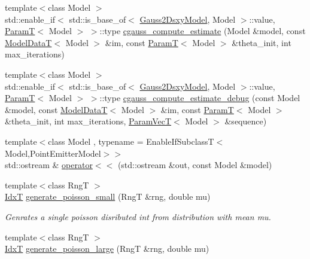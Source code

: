 \begin{DoxyCompactItemize}
\item 
{\footnotesize template$<$class Model $>$ }\\std\+::enable\+\_\+if$<$ std\+::is\+\_\+base\+\_\+of$<$ \hyperlink{classmappel_1_1Gauss2DsxyModel}{Gauss2\+Dsxy\+Model}, Model $>$\+::value, \hyperlink{namespacemappel_a667925cb0d6c0e49f2f035cc5a9a6857}{ParamT}$<$ Model $>$ $>$\+::type \hyperlink{namespacemappel_a0b7f83ad91e017a15ec1bd3daac10696}{cgauss\+\_\+compute\+\_\+estimate} (Model \&model, const \hyperlink{namespacemappel_a97f050df953605381ae9c901c3b125f1}{Model\+DataT}$<$ Model $>$ \&im, const \hyperlink{namespacemappel_a667925cb0d6c0e49f2f035cc5a9a6857}{ParamT}$<$ Model $>$ \&theta\+\_\+init, int max\+\_\+iterations)
\item 
{\footnotesize template$<$class Model $>$ }\\std\+::enable\+\_\+if$<$ std\+::is\+\_\+base\+\_\+of$<$ \hyperlink{classmappel_1_1Gauss2DsxyModel}{Gauss2\+Dsxy\+Model}, Model $>$\+::value, \hyperlink{namespacemappel_a667925cb0d6c0e49f2f035cc5a9a6857}{ParamT}$<$ Model $>$ $>$\+::type \hyperlink{namespacemappel_ae11a3f8db8843240c8fc2d823479cc23}{cgauss\+\_\+compute\+\_\+estimate\+\_\+debug} (const Model \&model, const \hyperlink{namespacemappel_a97f050df953605381ae9c901c3b125f1}{Model\+DataT}$<$ Model $>$ \&im, const \hyperlink{namespacemappel_a667925cb0d6c0e49f2f035cc5a9a6857}{ParamT}$<$ Model $>$ \&theta\+\_\+init, int max\+\_\+iterations, \hyperlink{namespacemappel_a0f86d3153e4e27b095012f140eea58de}{Param\+VecT}$<$ Model $>$ \&sequence)
\item 
{\footnotesize template$<$class Model , typename  = Enable\+If\+Subclass\+T$<$\+Model,\+Point\+Emitter\+Model$>$$>$ }\\std\+::ostream \& \hyperlink{namespacemappel_a6e0c0a729adcdd75dcf8f7f504884fbb}{operator$<$$<$} (std\+::ostream \&out, const Model \&model)
\item 
{\footnotesize template$<$class RngT $>$ }\\\hyperlink{namespacemappel_ab17ec0f30b61ece292439d7ece81d3a8}{IdxT} \hyperlink{namespacemappel_af5deeb186fbcfbd0f449064cc70e8a86}{generate\+\_\+poisson\+\_\+small} (RngT \&rng, double mu)
\begin{DoxyCompactList}\small\item\em Genrates a single poisson disributed int from distribution with mean mu. \end{DoxyCompactList}\item 
{\footnotesize template$<$class RngT $>$ }\\\hyperlink{namespacemappel_ab17ec0f30b61ece292439d7ece81d3a8}{IdxT} \hyperlink{namespacemappel_ae776a0d92c466702788b7405a4a166e0}{generate\+\_\+poisson\+\_\+large} (RngT \&rng, double mu)

\end{DoxyCompactItemize}
